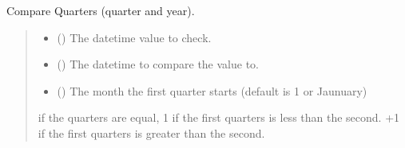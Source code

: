 \documentclass[letterpaper,10pt,english]{sphinxmanual}
\begin{document}
\begin{fulllineitems}
\begin{fulllineitems}
\begin{quote}
\begin{description}
\end{description}\end{quote}

\end{fulllineitems}


\begin{fulllineitems}
\label{\detokenize{apache_commons_validator_python.routines:apache_commons_validator_python.routines.calendar_validator.CalendarValidator.compare_quarters}}
\pysigstartsignatures
{}
\pysigstopsignatures
\sphinxAtStartPar
Compare Quarters (quarter and year).
\begin{quote}\begin{description}
\begin{itemize}
\item {} 
\sphinxAtStartPar
{} () \textendash{} The datetime value to check.

\item {} 
\sphinxAtStartPar
{} () \textendash{} The datetime to compare the value to.

\item {} 
\sphinxAtStartPar
{} () \textendash{} The month the first quarter starts (default is 1 or Jaunuary)

\end{itemize}

 if the quarters are equal,
\sphinxhyphen{}1 if the first quarters is less than the second.
+1 if the first quarters is greater than the second.


\end{description}
\end{quote}
\end{fulllineitems}
\end{fulllineitems}
\end{document}
